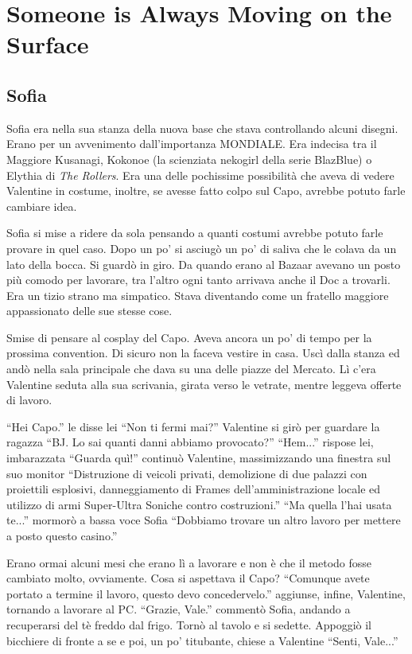 \chapter{Someone is Always Moving on the Surface}

  \section*{Sofia}

    Sofia era nella sua stanza della nuova base che stava controllando alcuni disegni. Erano per un avvenimento
    dall'importanza MONDIALE. Era indecisa tra il Maggiore Kusanagi, Kokonoe (la scienziata nekogirl della serie
    BlazBlue) o Elythia di \emph{The Rollers}. Era una delle pochissime possibilità che aveva di vedere Valentine in
    costume, inoltre, se avesse fatto colpo sul Capo, avrebbe potuto farle cambiare idea.

    Sofia si mise a ridere da sola pensando a quanti costumi avrebbe potuto farle provare in quel caso. Dopo un po' si
    asciugò un po' di saliva che le colava da un lato della bocca. Si guardò in giro. Da quando erano al Bazaar avevano
    un posto più comodo per lavorare, tra l'altro ogni tanto arrivava anche il Doc a trovarli. Era un tizio strano ma
    simpatico. Stava diventando come un fratello maggiore appassionato delle sue stesse cose.

    Smise di pensare al cosplay del Capo. Aveva ancora un po' di tempo per la prossima convention. Di sicuro non la
    faceva vestire in casa. Uscì dalla stanza ed andò nella sala principale che dava su una delle piazze del Mercato. Lì
    c'era Valentine seduta alla sua scrivania, girata verso le vetrate, mentre leggeva offerte di lavoro.

    ``Hei Capo.'' le disse lei ``Non ti fermi mai?'' Valentine si girò per guardare la ragazza ``BJ. Lo sai quanti danni
    abbiamo provocato?'' ``Hem...'' rispose lei, imbarazzata ``Guarda quì!'' continuò Valentine, massimizzando una
    finestra sul suo monitor ``Distruzione di veicoli privati, demolizione di due palazzi con proiettili esplosivi,
    danneggiamento di Frames dell'amministrazione locale ed utilizzo di armi Super-Ultra Soniche contro costruzioni.''
    ``Ma quella l'hai usata te...'' mormorò a bassa voce Sofia ``Dobbiamo trovare un altro lavoro per mettere a posto
    questo casino.''

    Erano ormai alcuni mesi che erano lì a lavorare e non è che il metodo fosse cambiato molto, ovviamente. Cosa si
    aspettava il Capo? ``Comunque avete portato a termine il lavoro, questo devo concedervelo.'' aggiunse, infine,
    Valentine, tornando a lavorare al PC. ``Grazie, Vale.'' commentò Sofia, andando a recuperarsi del tè freddo dal frigo. Tornò al tavolo e si
    sedette. Appoggiò il bicchiere di fronte a se e poi, un po' titubante, chiese a Valentine ``Senti, Vale...''

